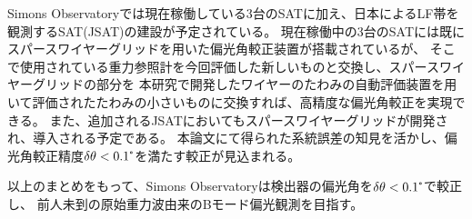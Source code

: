 \documentclass[../../main.tex]{subfiles}
\begin{document}
Simons Observatoryでは現在稼働している3台のSATに加え、日本によるLF帯を観測するSAT(JSAT)の建設が予定されている。
現在稼働中の3台のSATには既にスパースワイヤーグリッドを用いた偏光角較正装置が搭載されているが、
そこで使用されている重力参照計を今回評価した新しいものと交換し、スパースワイヤーグリッドの部分を
本研究で開発したワイヤーのたわみの自動評価装置を用いて評価されたたわみの小さいものに交換すれば、高精度な偏光角較正を実現できる。
また、追加されるJSATにおいてもスパースワイヤーグリッドが開発され、導入される予定である。
本論文にて得られた系統誤差の知見を活かし、偏光角較正精度$\delta\theta<0.1\tcdegree$を満たす較正が見込まれる。

以上のまとめをもって、Simons Observatoryは検出器の偏光角を$\delta\theta<0.1\tcdegree$で較正し、
前人未到の原始重力波由来のBモード偏光観測を目指す。
\end{document}
